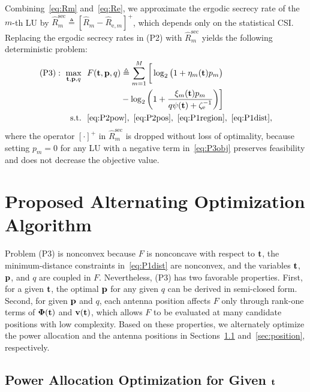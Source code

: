 \documentclass[journal]{IEEEtran}
\begin{document}
Combining~\eqref{eq:Rm} and~\eqref{eq:Re}, we approximate the ergodic secrecy rate of the $m$-th LU by $\hat R_m^{\mathrm{sec}}\triangleq[\hat R_m-\hat R_{\mathrm{e},m}]^+$, which depends only on the statistical CSI. Replacing the ergodic secrecy rates in (P2) with $\hat R_m^{\mathrm{sec}}$ yields the following deterministic problem:
\begin{subequations}\label{eq:P3}
\begin{align}
(\mathrm{P3}):\ \max_{\bt,\bp,q}\ \ & F(\bt,\bp,q)\triangleq\sum_{m=1}^{M}\bigg[\log_2\big(1+\eta_m(\bt)p_m\big)\nonumber\\
&\qquad\qquad-\log_2\bigg(1+\frac{\xi_m(\bt)p_m}{q\psi(\bt)+\zeta_{\mathrm e}^{-1}}\bigg)\bigg]\label{eq:P3obj}\\
\mathrm{s.t.}\ \ & \eqref{eq:P2pow},\ \eqref{eq:P2pos},\ \eqref{eq:P1region},\ \eqref{eq:P1dist},\nonumber
\end{align}
\end{subequations}
where the operator $[\cdot]^+$ in $\hat R_m^{\mathrm{sec}}$ is dropped without loss of optimality, because setting $p_m=0$ for any LU with a negative term in~\eqref{eq:P3obj} preserves feasibility and does not decrease the objective value.

\section{Proposed Alternating Optimization Algorithm}\label{sec:opt}
Problem (P3) is nonconvex because $F$ is nonconcave with respect to $\mathbf{t}$, the minimum-distance constraints in~\eqref{eq:P1dist} are nonconvex, and the variables $\mathbf{t}$, $\mathbf{p}$, and $q$ are coupled in $F$. Nevertheless, (P3) has two favorable properties. First, for a given $\mathbf{t}$, the optimal $\mathbf{p}$ for any given $q$ can be derived in semi-closed form. Second, for given $\mathbf{p}$ and $q$, each antenna position affects $F$ only through rank-one terms of $\boldsymbol{\Phi}(\mathbf{t})$ and $\mathbf{v}(\mathbf{t})$, which allows $F$ to be evaluated at many candidate positions with low complexity. Based on these properties, we alternately optimize the power allocation and the antenna positions in Sections~\ref{sec:power} and~\ref{sec:position}, respectively.

\subsection{Power Allocation Optimization for Given $\mathbf{t}$}\label{sec:power}
\end{document}
